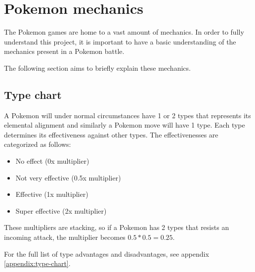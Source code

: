 \section{Pokemon mechanics}
\label{sec:pokemon-mechanics}

The Pokemon games are home to a vast amount of mechanics. In order to fully understand
this project, it is important to have a basic understanding of the mechanics present in a Pokemon battle.

The following section aims to briefly explain these mechanics.

\subsection{Type chart}
A Pokemon will under normal circumstances have 1 or 2 types that represents its elemental alignment and similarly a Pokemon move will have 1 type.
Each type determines its effectiveness against other types. The effectivenesses are categorized as follows:
\begin{itemize}
  \item No effect (0x multiplier)
  \item Not very effective (0.5x multiplier)
  \item Effective (1x multiplier)
  \item Super effective (2x multiplier)
\end{itemize}
These multipliers are stacking, so if a Pokemon has 2 types that resists an incoming attack, the multiplier becomes $ 0.5*0.5=0.25 $.

For the full list of type advantages and disadvantages, see appendix \ref{appendix:type-chart}.

